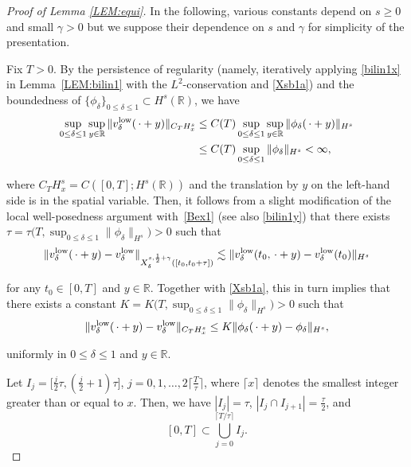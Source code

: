 \documentclass[letterpaper, 11pt,  reqno]{amsart}
\newcommand{\1}{\hspace{0.5mm}\textup{I}\hspace{0.5mm}}
\newcommand{\noi}{\noindent}
\newcommand{\R}{\mathbb{R}}
\newcommand{\low}{\textup{low}}
\newcommand{\dl}{\delta}
\newcommand{\g}{\gamma}
\numberwithin{equation}{section}
\numberwithin{theorem}{section}
\begin{document}
\begin{proof}[Proof of Lemma \ref{LEM:equi}]
In the following, various constants
depend on $s\ge 0$ and small $\g > 0$
but we suppose their dependence on $s$ and $\g$
for simplicity of the presentation.





Fix $T > 0$.
By the persistence of regularity
(namely, iteratively applying \eqref{bilin1x} in Lemma~\ref{LEM:bilin1}
with 
 the $L^2$-conservation
 and 
\eqref{Xsb1a})
and
 the boundedness of   $\{\phi_\dl\}_{0 \leq  \dl \le 1} \subset H^s(\R)$, 
  we have 
\begin{align}
\begin{split}
\sup_{0\leq \dl\leq 1}\sup_{y\in \R}\|v^\low _\dl(\,\cdot + y) \|_{C_T H^s_x}
& \le C(T) \sup_{0\leq \dl\leq 1}\sup_{y\in \R}\|\phi_\dl(\,\cdot + y) \|_{H^s}\\
& \leq C(T) \sup_{0\leq \dl\leq 1}\|\phi_\dl\|_{H^s} < \infty, 
\end{split}
\label{Bex1}
\end{align}

\noi
where
$C_{T}H^s_x
= C([0, T];H^s(\R))$
and
the translation by $y$ on the left-hand side is in the spatial variable.
Then, 
it follows from a slight modification of the local well-posedness argument
with~\eqref{Bex1} (see also \eqref{bilin1y})
that 
there exists  \(\tau = \tau\big(T,\sup_{0\leq \dl\leq 1}\|\phi_\dl\|_{H^s}\big)>0\) 
such that 
\begin{align}
\|v_\dl^\low(\, \cdot + y) - v_\dl^\low \|_{X^{s,\frac12+\gamma}_\dl([t_0,t_0+\tau])}\lesssim \|v_\dl^\low(t_0,\, \cdot + y) - v_\dl^\low(t_0)\|_{H^s}
\label{Bex2}
\end{align}

\noi
for any $t_0 \in [0, T]$ and $y \in \R$.
Together with \eqref{Xsb1a}, 
this  
 in turn implies that 
 there exists a constant \(K = K\big(T,\sup_{0\leq \dl\leq 1}\|\phi_\dl\|_{H^s}\big)>0\) such that
\begin{align}
\|v_\dl^\low(\, \cdot + y) - v_\dl^\low \|_{C_TH^s_x}\leq K\|\phi_\dl(\,\cdot+y) - \phi_\dl\|_{H^s}, 
\label{Bex3}
\end{align}

\noi
uniformly in $0 \le \dl  \le 1$ and 
 $y \in \R$.


Let
$I_j  = \big[\frac j 2 \tau, (\frac j 2 + 1)\tau\big]$, 
$j = 0, 1, \dots, 2 \big\lceil\frac T\tau \big\rceil$, 
where $\lceil x\rceil$ denotes the smallest integer
greater than or equal to $x$.
Then, we have $|I_j| = \tau$,  $|I_j\cap I_{j+1}| = \frac \tau 2$, 
and 
\[ [0, T] \subset \bigcup_{j = 0}^{\lceil T/\tau \rceil}I_j.\]



\end{proof}
\end{document}

